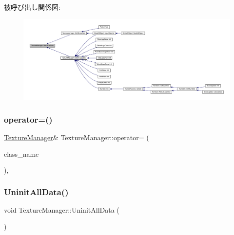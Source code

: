 被呼び出し関係図\+:
\nopagebreak
\begin{figure}[H]
\begin{center}
\leavevmode
\includegraphics[width=350pt]{class_texture_manager_a950562ff671a620592708906925fad7f_icgraph}
\end{center}
\end{figure}
\mbox{\label{class_texture_manager_a3f13712c65812a9053852165a9a67824}} 
\subsubsection{\texorpdfstring{operator=()}{operator=()}}
{\footnotesize\ttfamily \mbox{\hyperlink{class_texture_manager}{Texture\+Manager}}\& Texture\+Manager\+::operator= (\begin{DoxyParamCaption}\item[{const \mbox{\hyperlink{class_texture_manager}{Texture\+Manager}} \&}]{class\+\_\+name }\end{DoxyParamCaption})\hspace{0.3cm}{\ttfamily [private]}, {\ttfamily [delete]}}

\mbox{\label{class_texture_manager_a5e81df5cd89e7794fb9230357663a729}} 
\subsubsection{\texorpdfstring{Uninit\+All\+Data()}{UninitAllData()}}
{\footnotesize\ttfamily void Texture\+Manager\+::\+Uninit\+All\+Data (\begin{DoxyParamCaption}{ }\end{DoxyParamCaption})\hspace{0.3cm}{\ttfamily [static]}}



